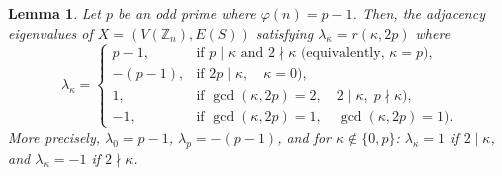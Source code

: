 \documentclass[12pt]{amsart}
\newtheorem{lemma}[theorem]{Lemma}
\begin{document}
\begin{lemma}\label{lem01eigs2p}
Let $p$ be an odd prime where $\varphi(n)=p-1$. Then, the adjacency eigenvalues
  of $X = (V(\mathbb{Z}_n),E(S))$ satisfying $ \lambda_\kappa=r(\kappa, 2p)$ where 
  \[
    \lambda_\kappa=
    \begin{cases}
      p-1,  & \text{if } p \mid \kappa \text{ and } 2 \nmid \kappa \text{ (equivalently, } \kappa = p), \\
      -(p-1), & \text{if } 2p \mid \kappa, \quad  \kappa= 0), \\
      1,   & \text{if } \gcd(\kappa, 2p) = 2, \quad 2 \mid \kappa,\; p \nmid \kappa), \\
      -1,  & \text{if } \gcd(\kappa, 2p) = 1, \quad \gcd(\kappa, 2p) = 1).
    \end{cases}
  \]
  More precisely, $\lambda_0 = p-1$, $\lambda_p = -(p-1)$, and for $\kappa \notin \{0, p\}$:
  $\lambda_\kappa = 1$ if $2 \mid \kappa$, and $\lambda_\kappa = -1$ if $2 \nmid \kappa$.
\end{lemma}
\end{document}
